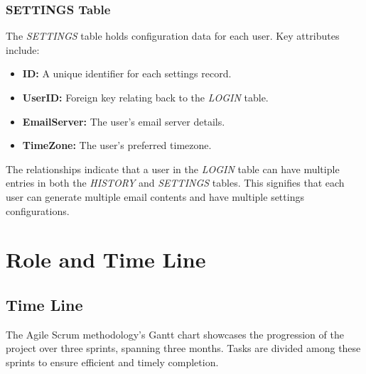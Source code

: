 \documentclass[12pt]{article}
\begin{document}
\subsubsection{SETTINGS Table}
The \textit{SETTINGS} table holds configuration data for each user. Key attributes include:
\begin{itemize}
	\item \textbf{ID:} A unique identifier for each settings record.
	\item \textbf{UserID:} Foreign key relating back to the \textit{LOGIN} table.
	\item \textbf{EmailServer:} The user's email server details.
	\item \textbf{TimeZone:} The user's preferred timezone.
\end{itemize}

The relationships indicate that a user in the \textit{LOGIN} table can have multiple entries in both the \textit{HISTORY} and \textit{SETTINGS} tables. This signifies that each user can generate multiple email contents and have multiple settings configurations.

\section{Role and Time Line}

\subsection{Time Line}

The Agile Scrum methodology's Gantt chart showcases the progression of the project over three sprints, spanning three months. Tasks are divided among these sprints to ensure efficient and timely completion.
\end{document}

